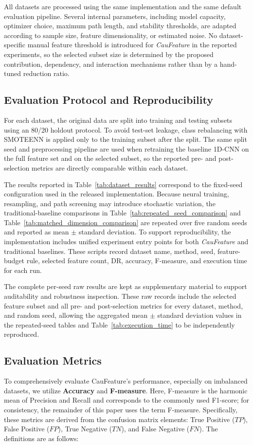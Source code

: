\documentclass[journal]{IEEEtran}
\begin{document}
All datasets are processed using the same implementation and the same default evaluation pipeline. Several internal parameters, including model capacity, optimizer choice, maximum path length, and stability thresholds, are adapted according to sample size, feature dimensionality, or estimated noise. No dataset-specific manual feature threshold is introduced for \textit{CauFeature} in the reported experiments, so the selected subset size is determined by the proposed contribution, dependency, and interaction mechanisms rather than by a hand-tuned reduction ratio.

\subsection{Evaluation Protocol and Reproducibility}
For each dataset, the original data are split into training and testing subsets using an 80/20 holdout protocol. To avoid test-set leakage, class rebalancing with SMOTEENN is applied only to the training subset after the split. The same split seed and preprocessing pipeline are used when retraining the baseline 1D-CNN on the full feature set and on the selected subset, so the reported pre- and post-selection metrics are directly comparable within each dataset.

The results reported in Table~\ref{tab:dataset_results} correspond to the fixed-seed configuration used in the released implementation. Because neural training, resampling, and path screening may introduce stochastic variation, the traditional-baseline comparisons in Table~\ref{tab:repeated_seed_comparison} and Table~\ref{tab:matched_dimension_comparison} are repeated over five random seeds and reported as mean $\pm$ standard deviation. To support reproducibility, the implementation includes unified experiment entry points for both \textit{CauFeature} and traditional baselines. These scripts record dataset name, method, seed, feature-budget rule, selected feature count, DR, accuracy, F-measure, and execution time for each run.

The complete per-seed raw results are kept as supplementary material to support auditability and robustness inspection. These raw records include the selected feature subset and all pre- and post-selection metrics for every dataset, method, and random seed, allowing the aggregated mean $\pm$ standard deviation values in the repeated-seed tables and Table~\ref{tab:execution_time} to be independently reproduced.

\subsection{Evaluation Metrics}
To comprehensively evaluate CauFeature's performance, especially on imbalanced datasets, we utilize \textbf{Accuracy} and \textbf{F-measure}. Here, F-measure is the harmonic mean of Precision and Recall and corresponds to the commonly used F1-score; for consistency, the remainder of this paper uses the term F-measure. Specifically, these metrics are derived from the confusion matrix elements: True Positive ($TP$), False Positive ($FP$), True Negative ($TN$), and False Negative ($FN$). The definitions are as follows:
\end{document}
